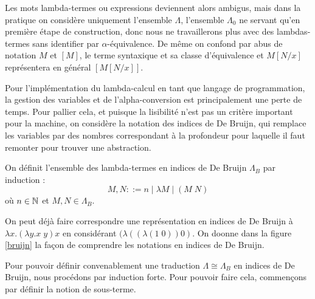 \begin{rmk}
    Les mots \og lambda-termes\fg{} ou \og expressions\fg{} deviennent alors ambigus, mais dans la pratique on considère uniquement l'ensemble $\Lambda$, l'ensemble $\Lambda_0$ ne servant qu'en première étape de construction, donc nous ne travaillerons plus avec des lambdas-termes sans identifier par $\alpha$-équivalence. De même on confond par abus de notation $M$ et $[M]$, le terme syntaxique et sa classe d'équivalence et $M[N/x]$ représentera en général $[M[N/x]]$.
\end{rmk}

Pour l'implémentation du lambda-calcul en tant que langage de programmation, la gestion des variables et de l'alpha-conversion est principalement une perte de temps. Pour pallier cela, et puisque la lisibilité n'est pas un critère important pour la machine, on considère la notation des indices de De Bruijn, qui remplace les variables par des nombres correspondant à la profondeur pour laquelle il faut remonter pour trouver une abstraction.

\begin{defi}
    On définit l'ensemble des lambda-termes en indices de De Bruijn $\Lambda_B$ par induction : $$M,N ::= n \mid \lambda M\mid (M\;N)$$ où $n\in\mathbb{N}$ et $M,N\in\Lambda_B$.
\end{defi}

On peut déjà faire correspondre une représentation en indices de De Bruijn à $\lambda x. (\lambda y.x\;y)x$ en considérant $(\lambda ((\lambda (1\;0))0)$. On doonne dans la figure \ref{bruijn} la façon de comprendre les notations en indices de De Bruijn.

\label{bruijn}

Pour pouvoir définir convenablement une traduction $\Lambda \cong \Lambda_B$ en indices de De Bruijn, nous procédons par induction forte. Pour pouvoir faire cela, commençons par définir la notion de sous-terme.

